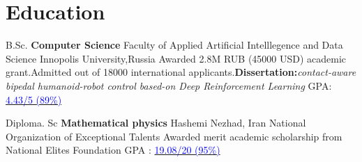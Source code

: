 \section{Education}
        \cventry{}
                {B.Sc. \textbf{Computer Science}}
                {Faculty of Applied Artificial Intelllegence and Data Science}
                {Innopolis University,Russia}
                {Awarded 2.8M RUB (45000 USD) academic grant.Admitted out of 18000 international applicants.\textbf{Dissertation:}\textit{contact-aware bipedal humanoid-robot control based-on Deep Reinforcement Learning} }
                { GPA: \href{https://disk.yandex.ru/d/eg4WYMcfnkl7fg}{\textcolor{blue}{4.43/5 (89\%)}} }
  
    \vspace{10pt}
    
    \cventry{}
            {Diploma. Sc \textbf{Mathematical physics}}
            {Hashemi Nezhad, Iran}
            {National Organization of Exceptional Talents}
            {Awarded merit academic scholarship from National Elites Foundation }
            {GPA : \href{https://drive.google.com/file/d/1N0k_16lOQtVe9FI5MGIu6QGJ8eLOUbus/view?usp=sharing}{\textcolor{blue}{19.08/20 (95\%)}}}